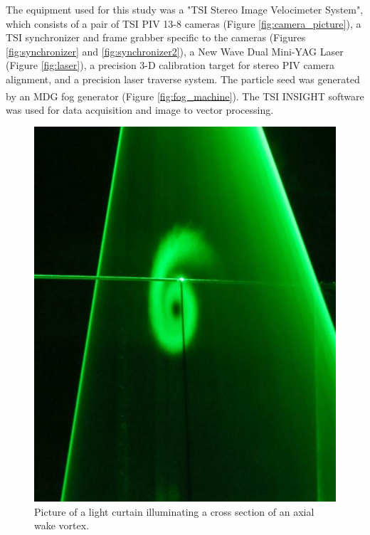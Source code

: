 The equipment used for this study was a "TSI Stereo Image Velocimeter System", 
which consists of a pair of TSI PIV 13-8 cameras (Figure 
\ref{fig:camera_picture}), a TSI synchronizer and frame 
grabber specific to the cameras (Figures \ref{fig:synchronizer} and 
\ref{fig:synchronizer2}), a New Wave Dual Mini-YAG Laser (Figure 
\ref{fig:laser}), a precision 3-D calibration target for stereo 
PIV camera alignment, and a precision laser traverse system. The particle seed 
was generated by an MDG fog generator (Figure \ref{fig:fog_machine}). The TSI 
INSIGHT\textsuperscript{\textcopyright} software was used 
for data acquisition and image to vector processing.

\makeatletter
{}
\makeatother

\vspace{32pt}
\begin{figure}[H]
	\centering
	\includegraphics[width=5in]{figs/piv_method/laser_sheet_picture}
	\caption{Picture of a light curtain illuminating a cross section of an 
	axial wake vortex.}
	\label{fig:laser_sheet_picture}
\end{figure}


